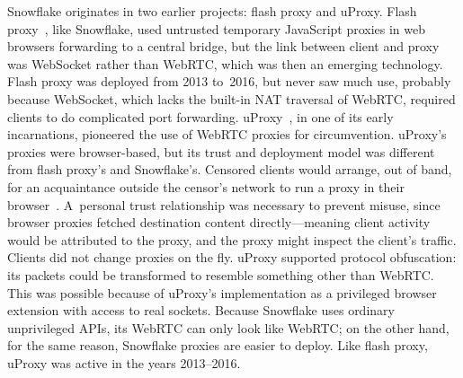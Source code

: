 \documentclass[letterpaper,twocolumn]{article}
\begin{document}
Snowflake originates in two earlier projects:
flash proxy and uProxy.
Flash proxy~\cite{Fifield2012a}, like Snowflake, used
untrusted temporary JavaScript proxies in web browsers
forwarding to a central bridge,
but the link between client and proxy was WebSocket
rather than WebRTC,
which was then an emerging technology.
Flash proxy was deployed
from 2013 to~2016,
but never saw much use,
probably because WebSocket,
which lacks the built-in NAT traversal of WebRTC,
required clients to do complicated port forwarding.
uProxy~\cite{uproxy}, in one of its early incarnations,
pioneered the use of WebRTC proxies for circumvention.
uProxy's proxies were browser-based,
but its trust and deployment model was different
from flash proxy's and Snowflake's.
Censored clients would arrange, out of band,
for an acquaintance outside the censor's network
to run a proxy in their browser~\cite{uproxy-design-doc}.
A~personal trust relationship was necessary to prevent misuse,
since browser proxies fetched destination content directly---meaning
client activity would be attributed to the proxy,
and the proxy might inspect the client's traffic.
Clients did not change proxies on the fly.
uProxy supported protocol obfuscation:
its packets could be transformed to resemble something
other than WebRTC.
This was possible because of
uProxy's implementation as a privileged browser extension
with access to real sockets.
Because Snowflake uses ordinary unprivileged APIs,
its WebRTC can only look like WebRTC;
on the other hand, for the same reason,
Snowflake proxies are easier to deploy.
Like flash proxy, uProxy was active in the years
2013--2016.
\end{document}
